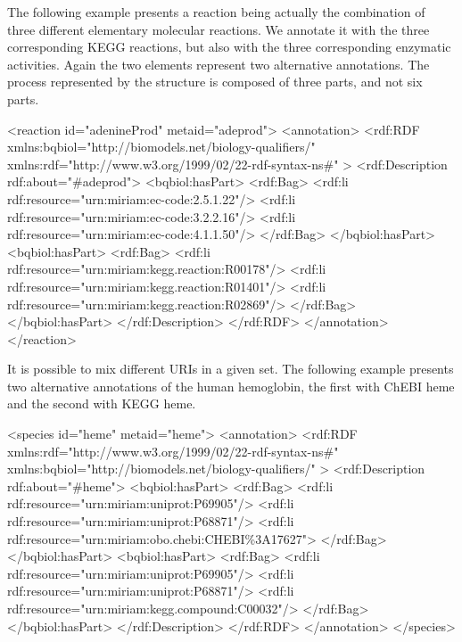 The following example presents a reaction being actually the
combination of three different elementary molecular reactions. We
annotate it with the three corresponding KEGG reactions, but also
with the three corresponding enzymatic activities.  Again the two
 elements represent two alternative annotations.
The process represented by the \Reaction structure is
composed of three parts, and  not six parts.

\begin{blockChanged}
\begin{example}
<reaction id="adenineProd" metaid="adeprod">
  <annotation>
    <rdf:RDF
      xmlns:bqbiol="http://biomodels.net/biology-qualifiers/"
      xmlns:rdf="http://www.w3.org/1999/02/22-rdf-syntax-ns\#"
    >
      <rdf:Description rdf:about="\#adeprod">
        <bqbiol:hasPart>
          <rdf:Bag>
            <rdf:li rdf:resource="urn:miriam:ec-code:2.5.1.22"/>
            <rdf:li rdf:resource="urn:miriam:ec-code:3.2.2.16"/>
            <rdf:li rdf:resource="urn:miriam:ec-code:4.1.1.50"/>
          </rdf:Bag>
        </bqbiol:hasPart>
        <bqbiol:hasPart>
          <rdf:Bag>
            <rdf:li rdf:resource="urn:miriam:kegg.reaction:R00178"/>
            <rdf:li rdf:resource="urn:miriam:kegg.reaction:R01401"/>
            <rdf:li rdf:resource="urn:miriam:kegg.reaction:R02869"/>
          </rdf:Bag>
        </bqbiol:hasPart>
      </rdf:Description>
    </rdf:RDF>
  </annotation>
</reaction>
\end{example}
\end{blockChanged}

It is possible to mix different URIs in a given set. The
following example presents two alternative annotations of the human
hemoglobin, the first with ChEBI heme and the second with KEGG
heme.

\begin{blockChanged}
\begin{example}
<species id="heme" metaid="heme">
  <annotation>
    <rdf:RDF
      xmlns:rdf="http://www.w3.org/1999/02/22-rdf-syntax-ns\#"
      xmlns:bqbiol="http://biomodels.net/biology-qualifiers/"
    >
     <rdf:Description rdf:about="\#heme">
       <bqbiol:hasPart>
         <rdf:Bag>
           <rdf:li rdf:resource="urn:miriam:uniprot:P69905"/>
           <rdf:li rdf:resource="urn:miriam:uniprot:P68871"/>
           <rdf:li rdf:resource="urn:miriam:obo.chebi:CHEBI\%3A17627">
         </rdf:Bag>
       </bqbiol:hasPart>
       <bqbiol:hasPart>
         <rdf:Bag>
          <rdf:li rdf:resource="urn:miriam:uniprot:P69905"/>
           <rdf:li rdf:resource="urn:miriam:uniprot:P68871"/>
           <rdf:li rdf:resource="urn:miriam:kegg.compound:C00032"/>
         </rdf:Bag>
       </bqbiol:hasPart>
     </rdf:Description>
   </rdf:RDF>
  </annotation>
</species>
\end{example}
\end{blockChanged}

